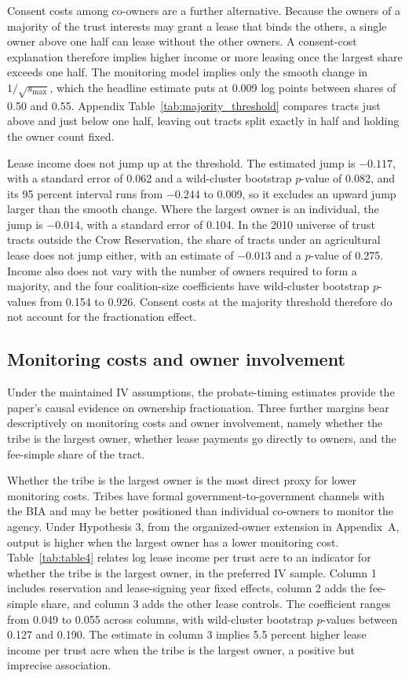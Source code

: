 \documentclass[12pt]{article}
\begin{document}
Consent costs among co-owners are a further alternative. Because the owners of a majority of the trust interests may grant a lease that binds the others, a single owner above one half can lease without the other owners. A consent-cost explanation therefore implies higher income or more leasing once the largest share exceeds one half. The monitoring model implies only the smooth change in $1/\sqrt{s_{\max}}$, which the headline estimate puts at 0.009 log points between shares of 0.50 and 0.55. Appendix Table~\ref{tab:majority_threshold} compares tracts just above and just below one half, leaving out tracts split exactly in half and holding the owner count fixed.

Lease income does not jump up at the threshold. The estimated jump is $-0.117$, with a standard error of 0.062 and a wild-cluster bootstrap $p$-value of 0.082, and its 95 percent interval runs from $-0.244$ to 0.009, so it excludes an upward jump larger than the smooth change. Where the largest owner is an individual, the jump is $-0.014$, with a standard error of 0.104. In the 2010 universe of trust tracts outside the Crow Reservation, the share of tracts under an agricultural lease does not jump either, with an estimate of $-0.013$ and a $p$-value of 0.275. Income also does not vary with the number of owners required to form a majority, and the four coalition-size coefficients have wild-cluster bootstrap $p$-values from 0.154 to 0.926. Consent costs at the majority threshold therefore do not account for the fractionation effect.

\subsection{Monitoring costs and owner involvement} \label{OtherPredictions}

Under the maintained IV assumptions, the probate-timing estimates provide the paper's causal evidence on ownership fractionation. Three further margins bear descriptively on monitoring costs and owner involvement, namely whether the tribe is the largest owner, whether lease payments go directly to owners, and the fee-simple share of the tract.

Whether the tribe is the largest owner is the most direct proxy for lower monitoring costs. Tribes have formal government-to-government channels with the BIA and may be better positioned than individual co-owners to monitor the agency. Under Hypothesis 3, from the organized-owner extension in Appendix~A, output is higher when the largest owner has a lower monitoring cost. Table~\ref{tab:table4} relates log lease income per trust acre to an indicator for whether the tribe is the largest owner, in the preferred IV sample. Column 1 includes reservation and lease-signing year fixed effects, column 2 adds the fee-simple share, and column 3 adds the other lease controls. The coefficient ranges from 0.049 to 0.055 across columns, with wild-cluster bootstrap $p$-values between 0.127 and 0.190. The estimate in column 3 implies 5.5 percent higher lease income per trust acre when the tribe is the largest owner, a positive but imprecise association.
\end{document}
